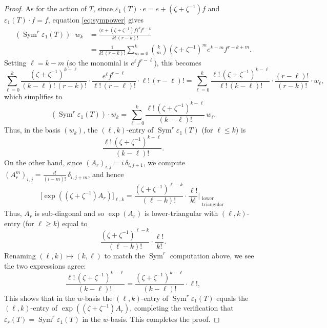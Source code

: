 \documentclass[10pt,a4paper]{amsart}
\DeclareMathOperator{\Sym}{Sym}
\begin{document}
\begin{proof}
    As for the action of $ T $, since $\varepsilon_1(T)\cdot e = e + (\zeta+\zeta^{-1})f$ and $\varepsilon_1(T)\cdot f = f$, equation \eqref{eq:sympower} gives
    \begin{align*}
    \left(\Sym^r\varepsilon_1(T)\right)\cdot w_k
    &= \frac{\bigl(e+(\zeta+\zeta^{-1})f\bigr)^k f^{r-k}}{k!\,(r-k)!} \\
    &= \frac{1}{k!\,(r-k)!}\sum_{m=0}^{k}\binom{k}{m}(\zeta+\zeta^{-1})^m e^{k-m}f^{r-k+m}.
    \end{align*}
    Setting $\ell = k-m$ (so the monomial is $e^\ell f^{r-\ell}$), this becomes
    \[
    \sum_{\ell=0}^{k} \frac{(\zeta+\zeta^{-1})^{k-\ell}}{(k-\ell)!\,(r-k)!}\cdot \frac{e^\ell f^{r-\ell}}{\ell!\,(r-\ell)!}\cdot \ell!\,(r-\ell)!
    = \sum_{\ell=0}^{k} \frac{\ell!\,(\zeta+\zeta^{-1})^{k-\ell}}{\ell!\,(k-\ell)!} \cdot \frac{(r-\ell)!}{(r-k)!} \cdot w_\ell,
    \]
    which simplifies to
    \[
    \left(\Sym^r\varepsilon_1(T)\right)\cdot w_k = \sum_{\ell=0}^{k} \frac{\ell!\,(\zeta+\zeta^{-1})^{k-\ell}}{(k-\ell)!}\, w_\ell.
    \]
    Thus, in the basis $(w_k)$, the $(\ell,k)$-entry of $\Sym^r\varepsilon_1(T)$ (for $\ell \leq k$) is
    \[
    \frac{\ell!\,(\zeta+\zeta^{-1})^{k-\ell}}{(k-\ell)!}.
    \]
    On the other hand, since $(A_r)_{i,j}= i\,\delta_{i,j+1}$, we compute $(A_r^m)_{i,j} = \frac{i!}{(i-m)!}\,\delta_{i,j+m}$, and hence
    \[
    \bigl[\exp\!\left((\zeta+\zeta^{-1})A_r\right)\bigr]_{\ell,k} = \frac{(\zeta+\zeta^{-1})^{\ell-k}}{(\ell-k)!}\cdot\frac{\ell!}{k!}\Bigg|_{\substack{\text{lower}\\\text{triangular}}}
    \]
    Thus, $A_r$ is sub-diagonal and so $\exp(A_r)$ is lower-triangular with $(\ell,k)$-entry (for $\ell \geq k$) equal to
    \[
    \frac{(\zeta+\zeta^{-1})^{\ell-k}}{(\ell-k)!}\cdot\frac{\ell!}{k!}.
    \]
    Renaming $(\ell, k) \mapsto (k, \ell)$ to match the $\Sym^r$ computation above, we see the two expressions agree:
    \[
    \frac{\ell!\,(\zeta+\zeta^{-1})^{k-\ell}}{(k-\ell)!\,} = \frac{(\zeta+\zeta^{-1})^{k-\ell}}{(k-\ell)!}\cdot \ell!,
    \]
    This shows that in the $w$-basis the $(\ell, k)$-entry of $\Sym^r\varepsilon_1(T)$ equals the $(\ell,k)$-entry of $\exp((\zeta+\zeta^{-1})A_r)$, completing the verification that $\varepsilon_r(T) = \Sym^r\varepsilon_1(T)$ in the $w$-basis. This completes the proof.
\end{proof}
\end{document}
